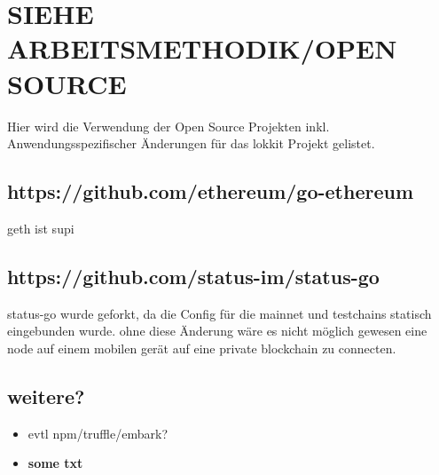 \chapter{SIEHE ARBEITSMETHODIK/OPEN SOURCE}
\label{app:Open_Source}
Hier wird die Verwendung der Open Source Projekten inkl. Anwendungsspezifischer Änderungen für das lokkit Projekt gelistet.

\section{https://github.com/ethereum/go-ethereum}
\label{app:sec:Go_Ethereum}
geth ist supi

\section{https://github.com/status-im/status-go}
\label{app:sec:Status_Go}
status-go wurde geforkt, da die Config für die mainnet und testchains statisch eingebunden wurde. ohne diese Änderung wäre es nicht möglich gewesen eine node auf einem mobilen gerät auf eine private blockchain zu connecten.

\section{weitere?}
\label{app:sec:XXXXX}
\begin{itemize}
    \item{evtl npm/truffle/embark?}
    \item \textbf{some txt}
\end{itemize}